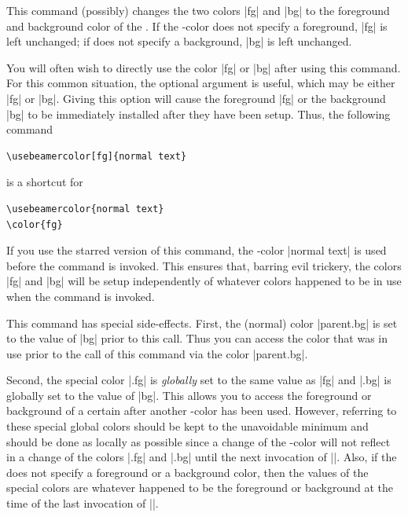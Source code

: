 \begin{command}{\usebeamercolor\opt{|*|}}
  This command (possibly) changes the two colors |fg| and |bg| to the foreground and background color of the . If the \beamer-color does not specify a foreground, |fg| is left unchanged; if does not specify a background, |bg| is left unchanged.

  You will often wish to directly use the color |fg| or |bg| after using this command. For this common situation, the optional argument  is useful, which may be either |fg| or |bg|. Giving this option will cause the foreground |fg| or the background |bg| to be immediately installed after they have been setup. Thus, the following command

\begin{verbatim}
\usebeamercolor[fg]{normal text}
\end{verbatim}
  is a shortcut for
\begin{verbatim}
\usebeamercolor{normal text}
\color{fg}
\end{verbatim}

  If you use the starred version of this command, the \beamer-color |normal text| is used before the command is invoked. This ensures that, barring evil trickery, the colors |fg| and |bg| will be setup independently of whatever colors happened to be in use when the command is invoked.

  This command has special side-effects. First, the (normal) color |parent.bg| is set to the value of |bg| prior to this call. Thus you can access the color that was in use prior to the call of this command via the color |parent.bg|.

  Second, the special color |.fg| is \emph{globally} set to the same value as |fg| and |.bg| is globally set to the value of |bg|. This allows you to access the foreground or background of a certain  after another \beamer-color has been used. However, referring to these special global colors should be kept to the unavoidable minimum and should be done as locally as possible since a change of the \beamer-color will not reflect in a change of the colors |.fg| and |.bg| until the next invocation of |\usebeamercolor|. Also, if the  does not specify a foreground or a background color, then the values of the special colors are whatever happened to be the foreground or background at the time of the last invocation of |\usebeamercolor|.


\end{command}
